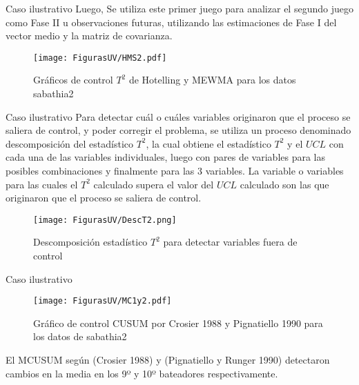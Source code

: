 \documentclass[10pt]{beamer}
\begin{document}
\begin{frame}{Caso ilustrativo}
Luego, Se utiliza este primer juego para analizar el segundo juego como Fase II u observaciones futuras, utilizando las estimaciones de Fase I del vector medio y la matriz de covarianza.
\begin{figure}[h!]
  \centering
  \texttt{[image: FigurasUV/HMS2.pdf]}
  \caption{Gráficos de control $T^2$ de Hotelling y MEWMA para los datos sabathia2}
\end{figure}
\end{frame}

\begin{frame}{Caso ilustrativo}
Para detectar cuál o cuáles variables originaron que el proceso se saliera de control, y poder corregir el problema, se utiliza un proceso denominado descomposición del estadístico $T^2$, la cual obtiene el estadístico $T^2$ y el $UCL$ con cada una de las variables individuales, luego con pares de variables para las posibles combinaciones y finalmente para las 3 variables. La variable o variables para las cuales el $T^2$ calculado supera el valor del $UCL$ calculado son las que originaron que el proceso se saliera de control. 
\begin{figure}[h!]
  \centering
  \texttt{[image: FigurasUV/DescT2.png]}
  \caption{Descomposición estadístico $T^2$ para detectar variables fuera de control}
\end{figure}
\end{frame}

\begin{frame}{Caso ilustrativo}
\begin{figure}[h!]
  \centering
  \texttt{[image: FigurasUV/MC1y2.pdf]}
  \caption{Gráfico de control CUSUM por Crosier 1988 y Pignatiello 1990 para los datos de sabathia2}
\end{figure}

El MCUSUM según (Crosier 1988) y (Pignatiello y Runger 1990) detectaron cambios en la media en los 9º y 10º bateadores respectivamente.
\end{frame}
\end{document}
